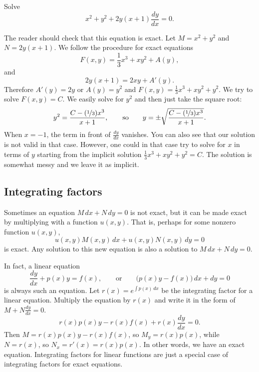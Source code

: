 \documentclass{ximera}
\begin{document}
\begin{example} \label{exact:exampleabove}
    Solve
    \begin{equation*}
        x^2+y^2 + 2y(x+1) \frac{dy}{dx} = 0 .
    \end{equation*}
\end{example}

\begin{exampleSol}
    The reader should check that this equation is exact. Let $M= x^2+y^2$ and $N=2y(x+1)$. We follow the procedure for exact equations
    \begin{equation*}
        F(x,y) = \frac{1}{3}x^3 + xy^2 + A(y) ,
    \end{equation*}
    and
    \begin{equation*}
        2y(x+1) = 2xy + A'(y) .
    \end{equation*}
    Therefore $A'(y) = 2y$ or $A(y) = y^2$ and $F(x,y) = \frac{1}{3}x^3 + xy^2 + y^2$. We try to solve $F(x,y) = C$.  We easily solve for $y^2$ and then just take the square root:
    \begin{equation*}
        y^2 = \frac{C-(\nicefrac{1}{3})x^3}{x+1}, \qquad \text{so} \qquad y = \pm \sqrt{\frac{C-(\nicefrac{1}{3})x^3}{x+1}} .
    \end{equation*}
    When $x=-1$, the term in front of $\frac{dy}{dx}$ vanishes.  You can also see that our solution is not valid in that case.  However, one could in that case try to solve for $x$ in terms of $y$ starting from the implicit solution $\frac{1}{3}x^3 + xy^2 + y^2 = C$.  The solution is somewhat messy and we leave it as implicit.
\end{exampleSol}

\subsection{Integrating factors}

Sometimes an equation $M\, dx + N \, dy = 0$ is not exact, but it can be made exact by multiplying with a function $u(x,y)$.  That is, perhaps for some nonzero function $u(x,y)$,
\begin{equation*}
    u(x,y) M(x,y) \, dx + u(x,y) N(x,y) \, dy = 0
\end{equation*}
is exact.  Any solution to this new equation is also a solution to $M\, dx + N \, dy = 0$.

In fact, a linear equation
\begin{equation*}
    \frac{dy}{dx} + p(x) y = f(x), \qquad \text{or} \qquad \bigl( p(x) y - f(x) \bigr)\, dx +  dy  = 0
\end{equation*}
is always such an equation.  Let $r(x) = e^{\int p(x)\,dx}$ be the integrating factor for a linear equation.  Multiply the equation by $r(x)$ and write it in the form of $M + N \frac{dy}{dx} = 0$.
\begin{equation*}
    r(x) p(x) y - r(x) f(x) + r(x) \frac{dy}{dx} = 0 .
\end{equation*}
Then $M = r(x) p(x) y - r(x) f(x)$, so $M_y = r(x) p(x)$, while $N = r(x)$, so $N_x = r'(x) = r(x) p(x)$.  In other words, we have an exact equation. Integrating factors for linear functions are just a special case of integrating factors for exact equations.
\end{document}
